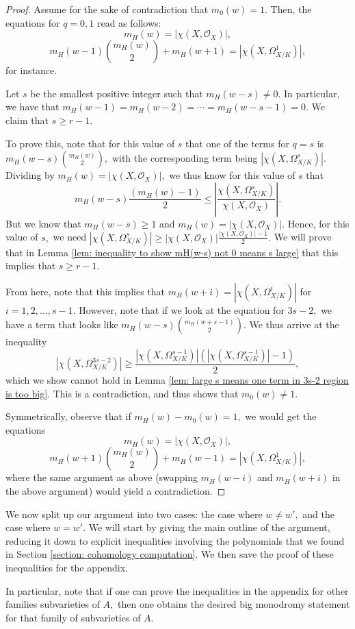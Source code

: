 \documentclass{article}
\theoremstyle{definition}
\theoremstyle{remark}
\begin{document}
\begin{proof}
Assume for the sake of contradiction that $m_0(w) = 1.$ Then, the equations for $q = 0, 1$ read as follows:
\[m_H(w) = |\chi(X, \mathcal{O}_X)|,\] \[m_H(w-1)\binom{m_H(w)}{2} + m_H(w+1) = |\chi(X, \Omega^1_{X/K})|,\] for instance.
\par Let $s$ be the smallest positive integer such that $m_H(w-s) \neq 0.$ In particular, we have that $m_H(w-1) = m_H(w-2) = \cdots = m_H(w-s-1) = 0.$ We claim that $s \geq r - 1.$
\par To prove this, note that for this value of $s$ that one of the terms for $q = s$ is $m_H(w-s) \binom{m_H(w)}{2},$ with the corresponding term being $|\chi(X, \Omega^{s}_{X/K})|.$ Dividing by $m_H(w) = |\chi(X, \mathcal{O}_X)|,$ we thus know for this value of $s$ that \[m_H(w-s) \frac{(m_H(w) - 1)}{2} \leq \left|\frac{\chi(X, \Omega^s_{X/K})}{\chi(X, \mathcal{O}_X)}\right|.\] But we know that $m_H(w-s) \geq 1$ and $m_H(w) = |\chi(X, \mathcal{O}_X)|.$ Hence, for this value of $s,$ we need $|\chi(X, \Omega^s_{X/K})| \geq |\chi(X, \mathcal{O}_X)|\frac{|\chi(X, \mathcal{O}_X)| - 1}{2}.$ We will prove that in Lemma \ref{lem: inequality to show mH(w-s) not 0 means s large} that this implies that $s \geq r - 1.$
\par From here, note that this implies that $m_H(w+i) = |\chi(X, \Omega_{X/K}^i)|$ for $i = 1, 2, \ldots, s-1.$ However, note that if we look at the equation for $3s - 2,$ we have a term that looks like $m_H(w-s) \binom{m_H(w + s - 1)}{2}.$ We thus arrive at the inequality \[|\chi(X, \Omega_{X/K}^{3s-2})| \geq \frac{|\chi(X, \Omega_{X/K}^{s-1})|(|\chi(X, \Omega_{X/K}^{s-1})|-1)}{2},\] which we show cannot hold in Lemma \ref{lem: large s means one term in 3s-2 region is too big}. This is a contradiction, and thus shows that $m_0(w) \neq 1.$
\par Symmetrically, observe that if $m_H(w) - m_0(w) = 1,$ we would get the equations \[m_H(w) = |\chi(X, \mathcal{O}_X)|,\] \[m_H(w+1)\binom{m_H(w)}{2} + m_H(w-1) = |\chi(X, \Omega^1_{X/K})|,\] where the same argument as above (swapping $m_H(w-i)$ and $m_H(w+i)$ in the above argument) would yield a contradiction.
\end{proof}
\par We now split up our argument into two cases: the case where $w \neq w',$ and the case where $w = w'.$ We will start by giving the main outline of the argument, reducing it down to explicit inequalities involving the polynomials that we found in Section \ref{section: cohomology computation}. We then save the proof of these inequalities for the appendix.
\par In particular, note that if one can prove the inequalities in the appendix for other families subvarieties of $A,$ then one obtains the desired big monodromy statement for that family of subvarieties of $A.$ 
\end{document}

